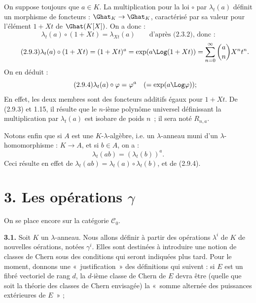 On
suppose toujours que \(a\in K\). La multiplication pour la loi \(\circ\) par \(\lambda_t(a)\) définit un morphisme de foncteurs : \(\Ghat_K\to\Ghat_K\), caractérisé par sa valeur pour l'élément \(1+Xt\) de \(\Ghat(K[X])\). On a donc :
\[
  \lambda_t(a)\circ(1+Xt)=\lambda_{Xt}(a)\qquad\text{d'après (2.3.2), donc :}
\]
\begin{equation}\tag{2.9.3}
  \lambda_t(a)\circ(1+Xt)
  =(1+Xt)^a
  =\exp(a\Log(1+Xt))
  =\sum_{n=0}^{\infty}\binom{a}{n}X^nt^n .
\end{equation}
On en déduit :
\begin{equation}\tag{2.9.4}
  \lambda_t(a)\circ\varphi=\varphi^a
  \quad(=\exp(a\Log\varphi)) ;
\end{equation}
En effet, les deux membres sont des foncteurs additifs égaux pour \(1+Xt\). De (2.9.3) et 1.15, il résulte que le \(n\)-ième polynôme universel définissant la multiplication par \(\lambda_t(a)\) est isobare de poids \(n\)~; il sera noté \(R_{n,a}\).

Notons enfin que si \(A\) est une \(K\)-\(\lambda\)-algèbre, i.e. un \(\lambda\)-anneau muni d'un \(\lambda\)-homomorphisme : \(K\to A\), et si \(b\in A\), on a :
\begin{equation}\tag{2.9.5}
  \lambda_t(ab)=(\lambda_t(b))^a .
\end{equation}
Ceci résulte en effet de \(\lambda_t(ab)=\lambda_t(a)\circ\lambda_t(b)\), et de (2.9.4).

\section*{3. Les opérations \(\gamma\)}

On se place encore sur la catégorie \(\mathcal C_0\).

\textbf{3.1.} Soit \(K\) un \(\lambda\)-anneau. Nous allons définir à partir des opérations \(\lambda^i\) de \(K\) de nouvelles oérations, notées \(\gamma^i\). Elles sont destinées à introduire une notion de classes de Chern sous des conditions qui seront indiquées plus tard. Pour le moment, donnons une «~justification~» des définitions qui suivent : si \(E\) est un fibré vectoriel de rang \(d\), la \(d\)-ième classe de Chern de \(E\) devra être (quelle que soit la théorie des classes de Chern envisagée) la «~somme alternée des puissances extérieures de \(E\)~» ;
